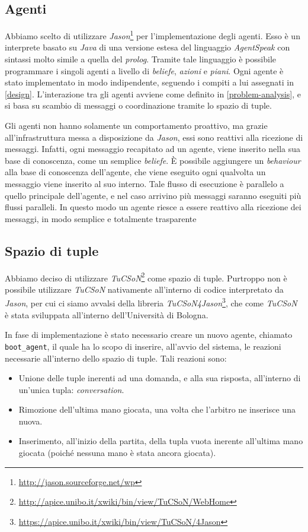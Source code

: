 \documentclass[a4paper,12pt]{article}
\begin{document}
\subsection{Agenti}
	Abbiamo scelto di utilizzare \emph{Jason}\footnote{\url{http://jason.sourceforge.net/wp}} per l'implementazione degli agenti. Esso è un interprete basato su \emph{Java} di una versione estesa del linguaggio \emph{AgentSpeak} con sintassi molto simile a quella del \emph{prolog}. Tramite tale linguaggio è possibile programmare i singoli agenti a livello di \emph{beliefe}, \emph{azioni} e \emph{piani}. Ogni agente è stato implementato in modo indipendente, seguendo i compiti a lui assegnati in \autoref{design}. L'interazione tra gli agenti avviene come definito in \autoref{problem-analysis}, e si basa su scambio di messaggi o coordinazione tramite lo spazio di tuple. 
	
	Gli agenti non hanno solamente un comportamento proattivo, ma grazie all'infrastruttura messa a disposizione da \emph{Jason}, essi sono reattivi alla ricezione di messaggi. Infatti, ogni messaggio recapitato ad un agente, viene inserito nella sua base di conoscenza, come un semplice \emph{beliefe}. \`{E} possibile aggiungere un \emph{behaviour} alla base di conoscenza dell'agente, che viene eseguito ogni qualvolta un messaggio viene inserito al suo interno. Tale flusso di esecuzione è parallelo a quello principale dell'agente, e nel caso arrivino più messaggi saranno eseguiti più flussi paralleli. In questo modo un agente riesce a essere reattivo alla ricezione dei messaggi, in modo semplice e totalmente trasparente 
\subsection{Spazio di tuple}
Abbiamo deciso di utilizzare \emph{TuCSoN}\footnote{\url{http://apice.unibo.it/xwiki/bin/view/TuCSoN/WebHome}} come spazio di tuple. Purtroppo non è possibile utilizzare \emph{TuCSoN} nativamente all'interno di codice interpretato da \emph{Jason}, per cui ci siamo avvalsi della libreria \emph{TuCSoN4Jason}\footnote{\url{https://apice.unibo.it/xwiki/bin/view/TuCSoN/4Jason}}, che come \emph{TuCSoN} è stata sviluppata all'interno dell'Università di Bologna. 

In fase di implementazione è stato necessario creare un nuovo agente, chiamato \texttt{boot\_agent}, il quale ha lo scopo di inserire, all'avvio del sistema, le reazioni necessarie all'interno dello spazio di tuple. Tali reazioni sono: 
\begin{itemize}
	\item Unione delle tuple inerenti ad una domanda, e alla sua risposta, all'interno di un'unica tupla: \emph{conversation}.
	\item Rimozione dell'ultima mano giocata, una volta che l'arbitro ne inserisce una nuova.
	\item Inserimento, all'inizio della partita, della tupla vuota inerente all'ultima mano giocata (poiché nessuna mano è stata ancora giocata).
\end{itemize}
\end{document}
